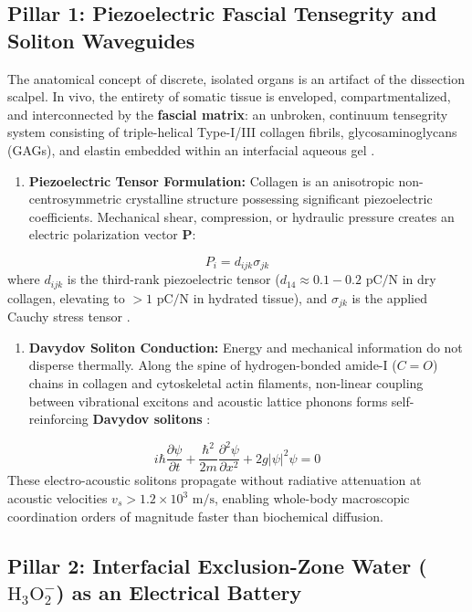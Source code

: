 \documentclass[10pt,twocolumn]{article}
\begin{document}
\subsection{Pillar 1: Piezoelectric Fascial Tensegrity and Soliton Waveguides}

The anatomical concept of discrete, isolated organs is an artifact of the dissection scalpel. In vivo, the entirety of somatic tissue is enveloped, compartmentalized, and interconnected by the \textbf{fascial matrix}: an unbroken, continuum tensegrity system consisting of triple-helical Type-I/III collagen fibrils, glycosaminoglycans (GAGs), and elastin embedded within an interfacial aqueous gel \cite{Ingber2008, Guimberteau2015}.

\begin{enumerate}
  \item \textbf{Piezoelectric Tensor Formulation:} Collagen is an anisotropic non-centrosymmetric crystalline structure possessing significant piezoelectric coefficients. Mechanical shear, compression, or hydraulic pressure creates an electric polarization vector $\mathbf{P}$:
\end{enumerate}
\begin{equation}
  P_i = d_{ijk} \sigma_{jk}
\end{equation}
   where $d_{ijk}$ is the third-rank piezoelectric tensor ($d_{14} \approx 0.1 - 0.2\text{ pC/N}$ in dry collagen, elevating to $> 1\text{ pC/N}$ in hydrated tissue), and $\sigma_{jk}$ is the applied Cauchy stress tensor \cite{Fukada1968}.
\begin{enumerate}
  \item \textbf{Davydov Soliton Conduction:} Energy and mechanical information do not disperse thermally. Along the spine of hydrogen-bonded amide-I ($C=O$) chains in collagen and cytoskeletal actin filaments, non-linear coupling between vibrational excitons and acoustic lattice phonons forms self-reinforcing \textbf{Davydov solitons} \cite{Davydov1979}:
\end{enumerate}
\begin{equation}
  i\hbar \frac{\partial \psi}{\partial t} + \frac{\hbar^2}{2m} \frac{\partial^2 \psi}{\partial x^2} + 2 g |\psi|^2 \psi = 0
\end{equation}
   These electro-acoustic solitons propagate without radiative attenuation at acoustic velocities $v_s > 1.2 \times 10^3\text{ m/s}$, enabling whole-body macroscopic coordination orders of magnitude faster than biochemical diffusion.


\subsection{Pillar 2: Interfacial Exclusion-Zone Water ($\text{H}_3\text{O}_2^-$) as an Electrical Battery}
\end{document}
